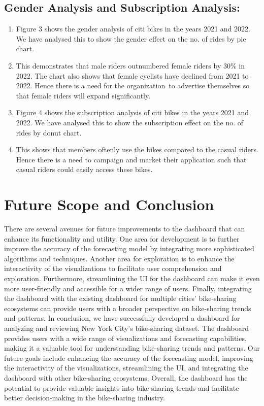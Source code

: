 \documentclass[journal]{vgtc}                     %
\begin{document}
\subsection{Gender Analysis and Subscription Analysis:}
\begin{enumerate}
    \item Figure 3 shows the gender analysis of citi bikes in the years 2021 and 2022. We have analysed this to show the gender effect on the no. of rides by pie chart. 
    \item This demonstrates that male riders outnumbered female riders by 30\% in 2022. The chart also shows that female cyclists have declined from 2021 to 2022. Hence there is a need for the organization to advertise themselves so that female riders will expand significantly.
    \item Figure 4 shows the subscription analysis of citi bikes in the years 2021 and 2022. We have analysed this to show the subscription effect on the no. of rides by donut chart.
    \item This shows that members oftenly use the bikes compared to the casual riders. Hence there is a need to campaign and market their application such that casual riders could easily access these bikes.
\end{enumerate}
\section{Future Scope and Conclusion}
There are several avenues for future improvements to the dashboard that can enhance its functionality and utility. One area for development is to further improve the accuracy of the forecasting model by integrating more sophisticated algorithms and techniques. Another area for exploration is to enhance the interactivity of the visualizations to facilitate user comprehension and exploration. Furthermore, streamlining the UI for the dashboard can make it even more user-friendly and accessible for a wider range of users. Finally, integrating the dashboard with the existing dashboard for multiple cities' bike-sharing ecosystems can provide users with a broader perspective on bike-sharing trends and patterns. In conclusion, we have successfully developed a dashboard for analyzing and reviewing New York City's bike-sharing dataset. The dashboard provides users with a wide range of visualizations and forecasting capabilities, making it a valuable tool for understanding bike-sharing trends and patterns. Our future goals include enhancing the accuracy of the forecasting model, improving the interactivity of the visualizations, streamlining the UI, and integrating the dashboard with other bike-sharing ecosystems. Overall, the dashboard has the potential to provide valuable insights into bike-sharing trends and facilitate better decision-making in the bike-sharing industry.
\end{document}
